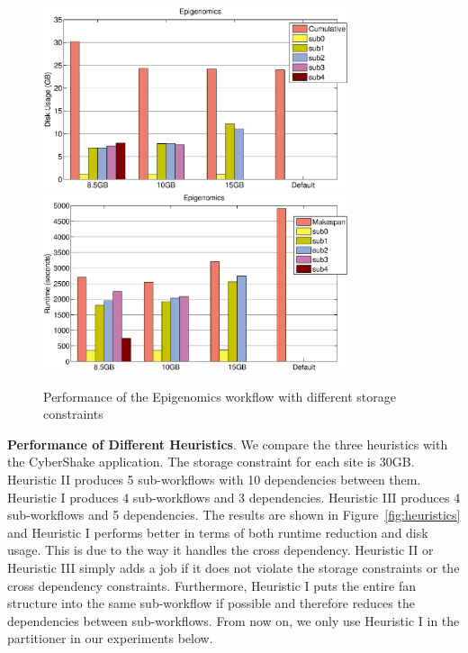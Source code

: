 \begin{figure}[h!]
	\centering
    \includegraphics[width=0.8\textwidth]{figures/partitioning/genome_usage.eps}
    \includegraphics[width=0.8\textwidth]{figures/partitioning/genome_makespan.eps}
    \caption{Performance of the Epigenomics workflow with different storage constraints}
    \label{fig:montage}
\end{figure}

\textbf{Performance of Different Heuristics}. We compare the three heuristics with the CyberShake application. The storage constraint for each site is 30GB. Heuristic II produces 5 sub-workflows with 10 dependencies between them. Heuristic I produces 4 sub-workflows and 3 dependencies. Heuristic III produces 4 sub-workflows and 5 dependencies. The results are shown in Figure~\ref{fig:heuristics} and Heuristic I performs better in terms of both runtime reduction and disk usage. This is due to the way it handles the cross dependency. Heuristic II or Heuristic III simply adds a job if it does not violate the storage constraints or the cross dependency constraints. Furthermore, Heuristic I puts the entire fan structure into the same sub-workflow if possible and therefore reduces the dependencies between sub-workflows. 
From now on, we only use Heuristic I in the partitioner in our experiments below.  

